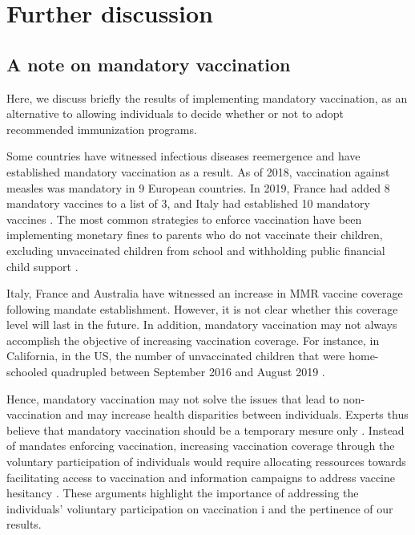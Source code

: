 \section{Further discussion}


\subsection{A note on mandatory vaccination}

Here, we discuss briefly the results of implementing mandatory vaccination, as an alternative to allowing individuals to decide whether or not to adopt recommended immunization programs.

Some countries have witnessed infectious diseases reemergence and have established mandatory vaccination as a result. As of 2018, vaccination against measles was mandatory in 9 European countries. In 2019, France had added 8 mandatory vaccines to a list of 3, and Italy had established 10 mandatory vaccines \cite[]{Bechini2019}. The most common strategies to enforce vaccination have been implementing monetary fines to parents who do not vaccinate their children, excluding unvaccinated children from school \cite[]{Drew2019,Bechini2019} and withholding public financial child support \cite[]{Drew2019,Australia2015}.

Italy, France and Australia have witnessed an increase in MMR vaccine coverage following mandate establishment. However, it is not clear whether this coverage level will last in the future. In addition, mandatory vaccination may not always accomplish the objective of increasing vaccination coverage. For instance, in California, in the US, the number of unvaccinated children that were home-schooled quadrupled between September 2016 and August 2019 \cite[]{Drew2019}. 

Hence, mandatory vaccination may not solve the issues that lead to non-vaccination and may increase health disparities between individuals. Experts thus believe that mandatory vaccination should be a temporary mesure only \cite[]{Bechini2019}. Instead of mandates enforcing vaccination, increasing vaccination coverage through the voluntary participation of individuals would require allocating ressources towards facilitating access to vaccination and information campaigns to address vaccine hesitancy \cite[]{Drew2019,Bechini2019}. These arguments highlight the importance of addressing the individuals' voliuntary participation on vaccination i and the pertinence of our results.